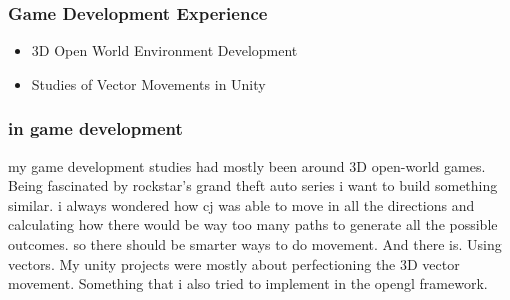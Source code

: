             \subsubsection{Game Development Experience} 
                \begin{itemize} 
                    \item 3D Open World Environment Development 
                    \item Studies of Vector Movements in Unity 
                \end{itemize}


            \subsubsection{in game development}
                my game development studies had mostly been around 3D open-world games. Being fascinated by rockstar's grand theft auto series i want to build something similar. i always wondered how cj was able to move in all the directions and calculating how there would be way too many paths to generate all the possible outcomes. so there should be smarter ways to do movement.
                And there is. Using vectors.
                My unity projects were mostly about perfectioning the 3D vector movement. Something that i also tried to implement in the opengl framework.   

